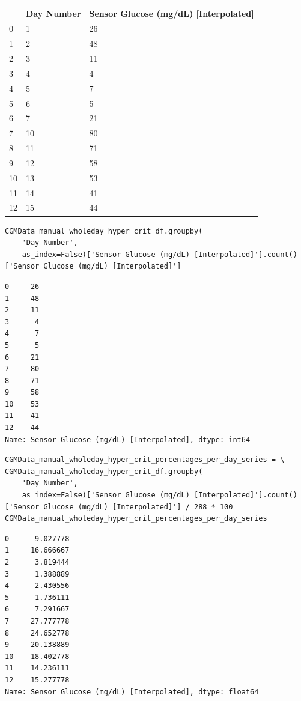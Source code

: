 \bigskip\noindent
\begin{tabular}{p{}p{}p{}}
\toprule
 & Day Number & Sensor Glucose (mg/dL) [Interpolated] \\
\hline
0 & 1 & 26 \\
\hline
1 & 2 & 48 \\
\hline
2 & 3 & 11 \\
\hline
3 & 4 & 4 \\
\hline
4 & 5 & 7 \\
\hline
5 & 6 & 5 \\
\hline
6 & 7 & 21 \\
\hline
7 & 10 & 80 \\
\hline
8 & 11 & 71 \\
\hline
9 & 12 & 58 \\
\hline
10 & 13 & 53 \\
\hline
11 & 14 & 41 \\
\hline
12 & 15 & 44 \\
\hline
\bottomrule
\end{tabular}

\bigskip

\begin{verbatim}
CGMData_manual_wholeday_hyper_crit_df.groupby(
    'Day Number', 
    as_index=False)['Sensor Glucose (mg/dL) [Interpolated]'].count()['Sensor Glucose (mg/dL) [Interpolated]']
\end{verbatim}

\begin{verbatim}
0     26
1     48
2     11
3      4
4      7
5      5
6     21
7     80
8     71
9     58
10    53
11    41
12    44
Name: Sensor Glucose (mg/dL) [Interpolated], dtype: int64
\end{verbatim}

\begin{verbatim}
CGMData_manual_wholeday_hyper_crit_percentages_per_day_series = \
CGMData_manual_wholeday_hyper_crit_df.groupby(
    'Day Number', 
    as_index=False)['Sensor Glucose (mg/dL) [Interpolated]'].count()['Sensor Glucose (mg/dL) [Interpolated]'] / 288 * 100
CGMData_manual_wholeday_hyper_crit_percentages_per_day_series
\end{verbatim}

\begin{verbatim}
0      9.027778
1     16.666667
2      3.819444
3      1.388889
4      2.430556
5      1.736111
6      7.291667
7     27.777778
8     24.652778
9     20.138889
10    18.402778
11    14.236111
12    15.277778
Name: Sensor Glucose (mg/dL) [Interpolated], dtype: float64
\end{verbatim}


